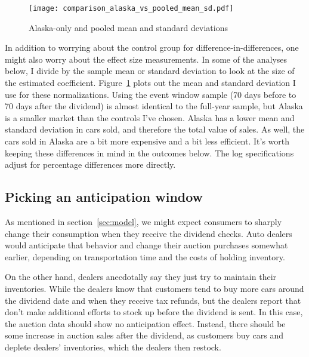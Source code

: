 \documentclass[11pt,letterpaper,oneside]{article}
\newcommand{\snippet}[1]{\hspace{-0.15em}}
\begin{document}
\begin{doublespacing}
\begin{figure}[bth]
	\caption{Alaska-only and pooled mean and standard deviations}
	\label{fig:alaska_vs_pooled_mean_sd}
	\texttt{[image: comparison\_alaska\_vs\_pooled\_mean\_sd.pdf]}
\end{figure}

In addition to worrying about the control group for difference\hyp{}in\hyp{}differences, one might also worry about the effect size measurements.
In some of the analyses below, I divide by the sample mean or standard deviation to look at the size of the estimated coefficient.
Figure~\ref{fig:alaska_vs_pooled_mean_sd} plots out the mean and standard deviation I use for these normalizations.
Using the event window sample (70 days before to 70 days after the dividend) is almost identical to the full\hyp{}year sample, but Alaska is a smaller market than the controls I've chosen.
Alaska has a lower mean and standard deviation in cars sold, and therefore the total value of sales.
As well, the cars sold in Alaska are a bit more expensive and a bit less efficient.
It's worth keeping these differences in mind in the outcomes below.
The log specifications adjust for percentage differences more directly.

\subsection{Picking an anticipation window}

As mentioned in section~\ref{sec:model}, we might expect consumers to sharply change their consumption when they receive the dividend checks.
Auto dealers would anticipate that behavior and change their auction purchases somewhat earlier, depending on transportation time and the costs of holding inventory.

On the other hand, dealers anecdotally say they just try to maintain their inventories.
While the dealers know that customers tend to  buy more cars around the dividend date and when they receive tax refunds, but the dealers report that don't make additional efforts to stock up before the dividend is sent.
In this case, the auction data should show no anticipation effect.
Instead, there should be some increase in auction sales after the dividend, as customers buy cars and deplete dealers' inventories, which the dealers then restock.

%


\end{doublespacing}
\end{document}
